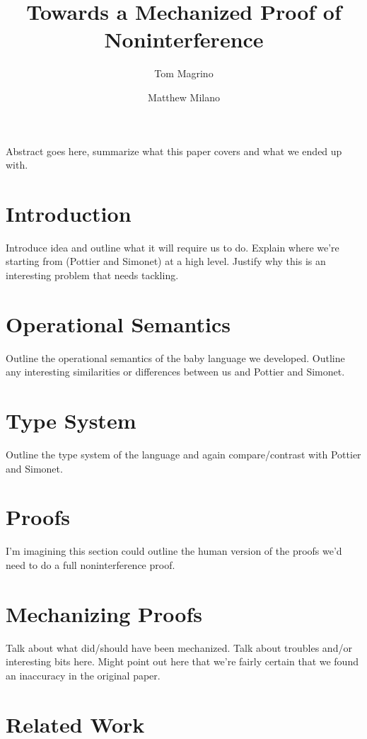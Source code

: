 \documentclass[a4paper,twocolumn]{article}
\title{Towards a Mechanized Proof of Noninterference}
\author{Tom Magrino \and Matthew Milano}
\begin{document}
\maketitle

\abstract
Abstract goes here, summarize what this paper covers and what we ended up with.

\section{Introduction}

Introduce idea and outline what it will require us to do.  Explain where we're
starting from (Pottier and Simonet) at a high level.  Justify why this is an
interesting problem that needs tackling.

\section{Operational Semantics}

Outline the operational semantics of the baby language we developed.  Outline
any interesting similarities or differences between us and Pottier and Simonet.

\section{Type System}

Outline the type system of the language and again compare/contrast with
Pottier and Simonet.

\section{Proofs}

I'm imagining this section could outline the human version of the proofs we'd
need to do a full noninterference proof.

\section{Mechanizing Proofs}

Talk about what did/should have been mechanized.  Talk about troubles and/or
interesting bits here.  Might point out here that we're fairly certain that we
found an inaccuracy in the original paper.

\section{Related Work}
\end{document}
